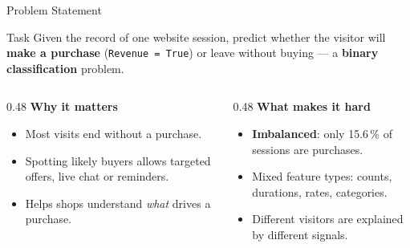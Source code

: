 \documentclass[aspectratio=169,11pt]{beamer}
\begin{document}
\begin{frame}{Problem Statement}
  \begin{block}{Task}
    Given the record of one website session, predict whether the visitor will \textbf{make a purchase}
    (\texttt{Revenue = True}) or leave without buying --- a \textbf{binary classification} problem.
  \end{block}
  \vspace{4pt}
  \begin{columns}[T,onlytextwidth]
    \begin{column}{0.48\textwidth}
      \textbf{Why it matters}
      \begin{itemize}\small
        \item Most visits end without a purchase.
        \item Spotting likely buyers allows targeted offers, live chat or reminders.
        \item Helps shops understand \emph{what} drives a purchase.
      \end{itemize}
    \end{column}
    \begin{column}{0.48\textwidth}
      \textbf{What makes it hard}
      \begin{itemize}\small
        \item \textbf{Imbalanced}: only 15.6\,\% of sessions are purchases.
        \item Mixed feature types: counts, durations, rates, categories.
        \item Different visitors are explained by different signals.
      \end{itemize}
    \end{column}
  \end{columns}
\end{frame}
\end{document}
